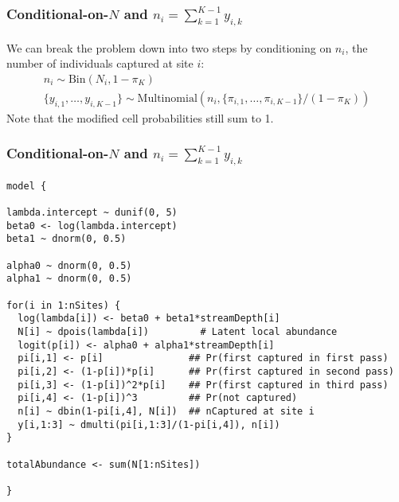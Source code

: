 \documentclass[color=usenames,dvipsnames]{beamer}\usepackage[]{graphicx}\usepackage[]{xcolor}
\makeatletter
\newenvironment{kframe}{%
 \def\at@end@of@kframe{}%
 \ifinner\ifhmode%
  \def\at@end@of@kframe{\end{minipage}}%
  \begin{minipage}{\columnwidth}%
 \fi\fi%
 \def\FrameCommand##1{\hskip\@totalleftmargin \hskip-\fboxsep
 \colorbox{shadecolor}{##1}\hskip-\fboxsep
     \hskip-\linewidth \hskip-\@totalleftmargin \hskip\columnwidth}%
 \MakeFramed {\advance\hsize-\width
   \@totalleftmargin\z@ \linewidth\hsize
   \@setminipage}}%
 {\par\unskip\endMakeFramed%
 \at@end@of@kframe}
\newenvironment{knitrout}{}{} %
\makeatother
\begin{document}
\begin{frame}[fragile]
  \frametitle{\normalsize Conditional-on-$N$ and $n_i=\sum_{k=1}^{K-1} y_{i,k}$}
  We can break the problem down into two steps by conditioning on
  $n_i$, the number of individuals captured at site $i$:
  \small
  \begin{gather*}
    n_i \sim \mathrm{Bin}(N_i, 1-\pi_K) \\
    \{y_{i,1}, \dots, y_{i,K-1}\} \sim \mathrm{Multinomial}(n_i,
    \{\pi_{i,1}, \dots, \pi_{i,K-1}\}/(1-\pi_K))
  \end{gather*}
  \pause
  \vfill
  Note that the modified cell probabilities still sum to 1. 
\end{frame}



\begin{frame}[fragile]
  \frametitle{\normalsize Conditional-on-$N$ and $n_i=\sum_{k=1}^{K-1} y_{i,k}$}
\vspace{-3pt}
\begin{knitrout}\scriptsize
{}\color{fgcolor}\begin{kframe}
\begin{verbatim}
model {

lambda.intercept ~ dunif(0, 5)
beta0 <- log(lambda.intercept)
beta1 ~ dnorm(0, 0.5)

alpha0 ~ dnorm(0, 0.5)  
alpha1 ~ dnorm(0, 0.5)

for(i in 1:nSites) {
  log(lambda[i]) <- beta0 + beta1*streamDepth[i]
  N[i] ~ dpois(lambda[i])         # Latent local abundance
  logit(p[i]) <- alpha0 + alpha1*streamDepth[i]
  pi[i,1] <- p[i]               ## Pr(first captured in first pass)
  pi[i,2] <- (1-p[i])*p[i]      ## Pr(first captured in second pass)
  pi[i,3] <- (1-p[i])^2*p[i]    ## Pr(first captured in third pass)
  pi[i,4] <- (1-p[i])^3         ## Pr(not captured)
  n[i] ~ dbin(1-pi[i,4], N[i])  ## nCaptured at site i
  y[i,1:3] ~ dmulti(pi[i,1:3]/(1-pi[i,4]), n[i])
}

totalAbundance <- sum(N[1:nSites])

}
\end{verbatim}
\end{kframe}
\end{knitrout}
\end{frame}
\end{document}
